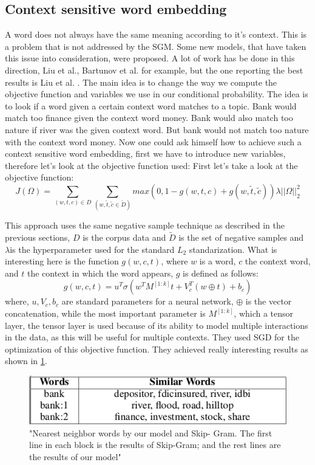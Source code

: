 {\subsection{Context sensitive word embedding}
A word does not always have the same meaning according to it's context. This is a problem that is not addressed by the SGM. Some new models, that have taken this issue into consideration, were proposed. A lot of work has be done in this direction, Liu et al.\cite{topicalWE},  Bartunov et al.\cite{breaking} for example, but the one reporting the best results is Liu et al. \cite{contextWithTensor}. The main idea is to change the way we compute the objective function and variables we use in our conditional probability. The idea is to look if a word given a certain context word matches to a topic. Bank would match too finance given the context word money. Bank would also match too nature if river was the given context word. But bank would not match too nature with the context word money. Now one could ask himself how to achieve such a context sensitive word embedding, first we have to introduce new variables, therefore let's look at the objective function used: 
First let's take a look at the objective function:
\begin{equation}
J(\Omega) = \sum_{(w,t,c)\in D} \sum_{(w,\tilde{t},\tilde{c} \in{\tilde{D}})} max(0,1- g(w,t,c) + g(w,\tilde{t},\tilde{c})) \lambda||\Omega||_{2}^2
\end{equation}

This approach uses the same negative sample technique as described in the previous sections, $D$ is the corpus data and $\tilde{D}$ is the set of negative samples and $\lambda$is the hyperparameter used for the standard $L_2$ standarization. What is interesting here is the function $g(w,c,t)$, where $w$ is a word, $c$ the context word, and $t$ the context in which the word appears, $g$ is defined as follows: 
\begin{equation}
g(w,c,t) = u^T \sigma(w^TM^{[1:k]}t+V_c^T(w \oplus t) + b_c)
\end{equation}
where, $u, V_c, b_c$ are standard parameters for a neural network, $\oplus$ is the vector concatenation, while the most important parameter is $M^{[1:k]}$, which a tensor layer, the tensor layer is used because of its ability to model multiple interactions in the data, as this will be useful for multiple contexts. They used SGD for the optimization of this objective function.  They achieved really interesting results as shown in \ref{fig:multipleContext}.
\begin{figure}[ht]
    \centering
			\includegraphics[scale=0.7]{images/multipleContext.png} 
    \caption{"Nearest  neighbor  words  by  our  model  and  Skip-
Gram. The first line in each block is the results of Skip-Gram;
and the rest lines are the results of our model" \cite{contextWithTensor}}
    \label{fig:multipleContext}
\end{figure}

}
